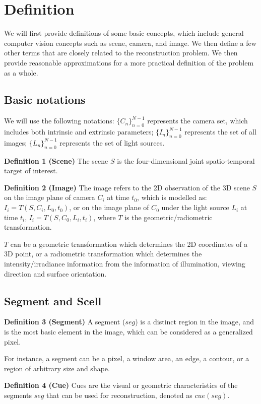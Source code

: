 \section{Definition}
\label{sec:3DRecon_Def}
We will first provide definitions of some basic concepts, which include general computer vision concepts such as scene, camera, and image. We then define a few other terms that are closely related to the reconstruction problem. We then provide reasonable approximations for a more practical definition of the problem as a whole.

\subsection{Basic notations}
We will use the following notations: $\{C_n\}_{n=0}^{N-1}$ represents the camera set, which includes both intrinsic and extrinsic parameters; $\{I_n\}_{n=0}^{N-1}$ represents the set of all images; $\{L_n\}_{n=0}^{N-1}$ represents the set of light sources.

\noindent\textbf{Definition 1 (Scene)} The scene $S$ is the four-dimensional joint spatio-temporal target of interest.

\noindent\textbf{Definition 2 (Image)} The image refers to the 2D observation of the 3D scene $S$ on the image plane of camera $C_i$ at time $t_0$, which is modelled as: $I_i = T(S, C_i, L_0, t_0)$, or on the image plane of $C_0$  under the light source $L_i$ at time $t_i$, $I_i= T(S, C_0, L_i, t_i)$, where $T$ is the geometric/radiometric transformation.

$T$ can be a geometric transformation which determines the 2D coordinates of a 3D point, or a radiometric transformation which determines the intensity/irradiance information from the information of illumination, viewing direction and surface orientation.

\subsection{Segment and Scell}
\noindent\textbf{Definition 3 (Segment)} A segment ($seg$) is a distinct region in the image, and is the most basic element in the image, which can be considered as a generalized pixel. 

For instance, a segment can be a pixel, a window area, an edge, a contour, or a region of arbitrary size and shape.

\noindent\textbf{Definition 4 (Cue)} Cues are the visual or geometric characteristics of the segments $seg$ that can be used for reconstruction, denoted as $cue(seg)$.

